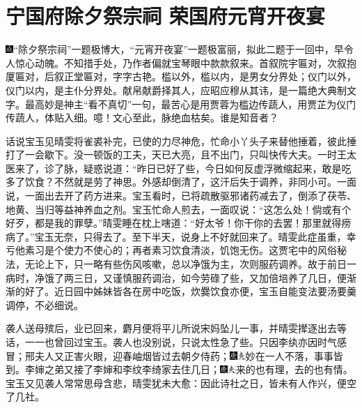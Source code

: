 

\chapter{宁国府除夕祭宗祠 荣国府元宵开夜宴}

{\includegraphics[width=3mm]{../Images/00005}``除夕祭宗祠''一题极博大，``元宵开夜宴''一题极富丽，拟此二题于一回中，早令人惊心动魄。不知措手处，乃作者偏就宝琴眼中款款叙来。首叙院宇匾对，次叙抱厦匾对，后叙正堂匾对，字字古艳。槛以外，槛以内，是男女分界处；仪门以外，仪门以内，是主仆分界处。献帛献爵择其人，应昭应穆从其讳，是一篇绝大典制文字。最高妙是神主``看不真切''一句，最苦心是用贾蓉为槛边传蔬人，用贾芷为仪门传蔬人，体贴入细。噫！文心至此，脉绝血枯矣。谁是知音者？}

话说宝玉见晴雯将雀裘补完，已使的力尽神危，忙命小丫头子来替他捶着，彼此捶打了一会歇下。没一顿饭的工夫，天已大亮，且不出门，只叫快传大夫。一时王太医来了，诊了脉，疑惑说道：``昨日已好了些，今日如何反虚浮微缩起来，敢是吃多了饮食？不然就是劳了神思。外感却倒清了，这汗后失于调养，非同小可。一面说，一面出去开了药方进来。宝玉看时，已将疏散驱邪诸药减去了，倒添了茯苓、地黄、当归等益神养血之剂。宝玉忙命人煎去，一面叹说：``这怎么处！倘或有个好歹，都是我的罪孽。''晴雯睡在枕上嗐道：``好太爷！你干你的去罢！那里就得痨病了。''宝玉无奈，只得去了。至下半天，说身上不好就回来了。晴雯此症虽重，幸亏他素习是个使力不使心的；再者素习饮食清淡，饥饱无伤。这贾宅中的风俗秘法，无论上下，只一略有些伤风咳嗽，总以净饿为主，次则服药调养。故于前日一病时，净饿了两三日，又谨慎服药调治，如今劳碌了些，又加倍培养了几日，便渐渐的好了。近日园中姊妹皆各在房中吃饭，炊爨饮食亦便，宝玉自能变法要汤要羹调停，不必细说。

袭人送母殡后，业已回来，麝月便将平儿所说宋妈坠儿一事，并晴雯撵逐出去等话，一一也曾回过宝玉。袭人也没别说，只说太性急了些。只因李纨亦因时气感冒；邢夫人又正害火眼，迎春岫烟皆过去朝夕侍药；{\includegraphics[width=3mm]{../Images/00004}\includegraphics[width=3mm]{../Images/00012}\footnotesize \kaishu 妙在一人不落，事事皆到。}李婶之弟又接了李婶和李纹李绮家去住几日；{\includegraphics[width=3mm]{../Images/00004}\includegraphics[width=3mm]{../Images/00012}\footnotesize \kaishu 来的也有理，去的也有情。}宝玉又见袭人常常思母含悲，晴雯犹未大愈：因此诗社之日，皆未有人作兴，便空了几社。

